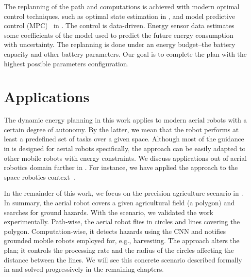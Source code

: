 The replanning of the path and computations is achieved with modern optimal control techniques, such as optimal state estimation in , and  model predictive control (MPC)~\citep{rawlings2017model} in . The control is data-driven. Energy sensor data estimates some coefficients of the model used to predict the future energy consumption with uncertainty. The replanning is done under an energy budget--the battery capacity and other battery parameters. Our goal is to complete the plan with the highest possible parameters configuration. 


\section{Applications}

The dynamic energy planning in this work applies to modern aerial robots with a certain degree of autonomy. By the latter, we mean that the robot performs at least a predefined set of tasks over a given space. Although most of the guidance in  is designed for aerial robots specifically, the approach can be easily adapted to other mobile robots with energy constraints. We discuss applications out of aerial robotics domain further in . For instance, we have applied the approach to the space robotics context~\citep{seewald2020beyond}. 

In the remainder of this work, we focus on the precision agriculture scenario in . In summary, the aerial robot covers a given agricultural field (a polygon) and searches for ground hazards. With the scenario, we validated the work experimentally. Path-wise, the aerial robot flies in circles and lines covering the polygon. Computation-wise, it detects hazards using the CNN and notifies grounded mobile robots employed for, e.g., harvesting. The approach alters the plan; it controls the processing rate and the radius of the circles affecting the distance between the lines. We will see this concrete scenario described formally in  and solved progressively in the remaining chapters.



